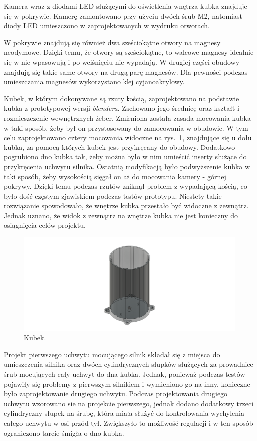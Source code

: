 Kamera wraz z diodami LED służącymi do oświetlenia wnętrza kubka znajduje się w pokrywie. Kamerę zamontowano przy użyciu dwóch śrub M2, natomiast
diody LED umieszczono w zaprojektowanych w wydruku otworach.

W pokrywie znajdują się również dwa sześciokątne otwory na magnesy neodymowe. Dzięki temu, że otwory są sześciokątne, to walcowe magnesy idealnie
się w nie wpasowują i po wciśnięciu nie wypadają. W drugiej części obudowy znajdują się takie same otwory na drugą parę magnesów. Dla pewności podczas umieszczania magnesów 
wykorzystano klej cyjanoakrylowy.

Kubek, w którym dokonywane są rzuty kością, zaprojektowano na podstawie kubka z prototypowej wersji \textit{blendera}. Zachowano jego średnicę oraz kształt i rozmieszczenie wewnętrznych
żeber. Zmieniona została zasada mocowania kubka w taki sposób, żeby był on przystosowany do zamocowania w obudowie. W tym celu zaprojektowano
cztery mocowania widoczne na rys.~\ref{fig:kubek}, znajdujące się u dołu kubka, za pomocą których kubek jest przykręcany do obudowy. Dodatkowo pogrubiono dno kubka tak, żeby można było w nim umieścić inserty służące 
do przykręcenia uchwytu silnika. Ostatnią modyfikacją było podwyższenie kubka w taki sposób, żeby wysokością sięgał on aż do mocowania kamery - górnej pokrywy.
Dzięki temu podczas rzutów zniknął problem z wypadającą kością, co było dość częstym zjawiskiem podczas testów prototypu. Niestety takie rozwiązanie
spowodowało, że wnętrze kubka przestało być widoczne z zewnątrz. Jednak uznano, że widok z zewnątrz na wnętrze kubka nie jest konieczny do osiągnięcia celów projektu.

\begin{figure}[H]
    \centering
    \includegraphics[width=0.95\linewidth]{chapters/03-praca-wlasna/figures/kubek}
    \caption{\label{fig:kubek}Kubek.}
\end{figure}

Projekt pierwszego uchwytu mocującego silnik składał się z miejsca do umieszczenia silnika oraz dwóch cylindrycznych słupków służących za prowadnice
śrub mocujących cały uchwyt do dna kubka. Jednak, ponieważ podczas testów pojawiły się problemy z pierwszym silnikiem i wymieniono go na inny, konieczne
było zaprojektowanie drugiego uchwytu. Podczas projektowania drugiego uchwytu wzorowano sie na projekcie pierwszego, jednak dodano dodatkowy trzeci
cylindryczny słupek na śrubę, która miała służyć do kontrolowania wychylenia całego uchwytu w osi przód-tył. Zwiększyło to możliwość regulacji i w ten sposób
ograniczono tarcie śmigła o dno kubka.

